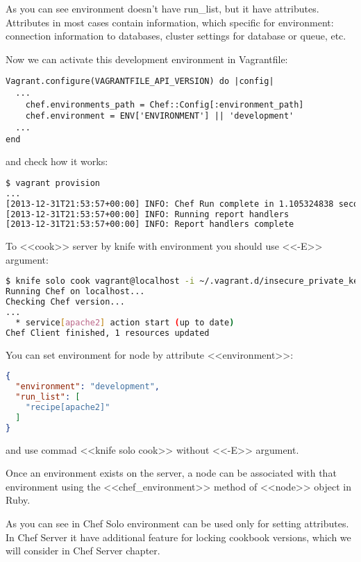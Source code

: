 As you can see environment doesn't have run\_list, but it have attributes. Attributes in most cases contain information, which specific for environment: connection information to databases, cluster settings for database or queue, etc.

Now we can activate this development environment in Vagrantfile:

\begin{lstlisting}[label=lst:my-cloud-chef-environment2,title=my-cloud/Vagrantfile]
Vagrant.configure(VAGRANTFILE_API_VERSION) do |config|
  ...
    chef.environments_path = Chef::Config[:environment_path]
    chef.environment = ENV['ENVIRONMENT'] || 'development'
  ...
end
\end{lstlisting}

and check how it works:

\begin{lstlisting}[language=Bash,label=lst:my-cloud-chef-environment3]
$ vagrant provision
...
[2013-12-31T21:53:57+00:00] INFO: Chef Run complete in 1.105324838 seconds
[2013-12-31T21:53:57+00:00] INFO: Running report handlers
[2013-12-31T21:53:57+00:00] INFO: Report handlers complete
\end{lstlisting}

To <<cook>> server by knife with environment you should use <<-E>> argument:

\begin{lstlisting}[language=Bash,label=lst:my-cloud-chef-environment4]
$ knife solo cook vagrant@localhost -i ~/.vagrant.d/insecure_private_key -p 2222 -N web1.example.com -E development
Running Chef on localhost...
Checking Chef version...
...
  * service[apache2] action start (up to date)
Chef Client finished, 1 resources updated
\end{lstlisting}

You can set environment for node by attribute <<environment>>:

\begin{lstlisting}[language=JSON,label=lst:my-cloud-chef-environment5,title=my-cloud/nodes/web1.example.com.json]
{
  "environment": "development",
  "run_list": [
    "recipe[apache2]"
  ]
}
\end{lstlisting}

and use commad <<knife solo cook>> without <<-E>> argument.

Once an environment exists on the server, a node can be associated with that environment using the <<chef\_environment>> method of <<node>> object in Ruby.

As you can see in Chef Solo environment can be used only for setting attributes. In Chef Server it have additional feature for locking cookbook versions, which we will consider in Chef Server chapter.